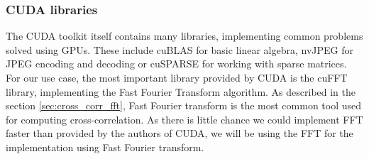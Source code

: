 \subsubsection{CUDA libraries}
\label{sec:cuda_libs}
The CUDA toolkit itself contains many libraries, implementing common problems solved using GPUs. These include cuBLAS for basic linear algebra, nvJPEG for JPEG encoding and decoding or cuSPARSE for working with sparse matrices. For our use case, the most important library provided by CUDA is the cuFFT library, implementing the Fast Fourier Transform algorithm. As described in the section \ref{sec:cross_corr_fft}, Fast Fourier transform is the most common tool used for computing cross-correlation. As there is little chance we could implement FFT faster than provided by the authors of CUDA, we will be using the FFT for the implementation using Fast Fourier transform.


